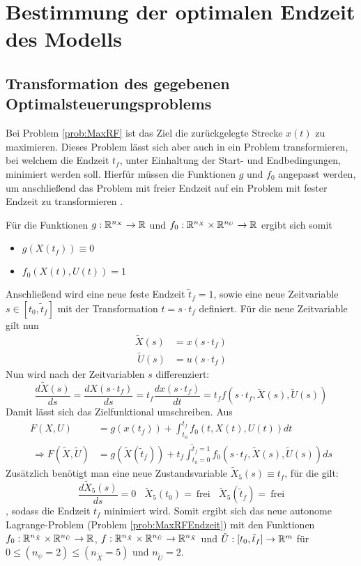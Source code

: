 \chapter{Bestimmung der optimalen Endzeit des Modells}\label{kap:OptTf}

\section{Transformation des gegebenen Optimalsteuerungsproblems}
Bei Problem \ref{prob:MaxRF} ist das Ziel die zurückgelegte Strecke $x(t)$ zu maximieren. Dieses Problem lässt sich aber auch in ein Problem transformieren, bei welchem die Endzeit $t_f$, unter Einhaltung der Start- und Endbedingungen, minimiert werden soll. Hierfür müssen die Funktionen $g$ und $f_0$ angepasst werden, um anschließend das Problem mit freier Endzeit auf ein Problem mit fester Endzeit zu transformieren \cite{Gerdts2011}.

Für die Funktionen $g : \mathbb{R}^{n_X} \to \mathbb{R}$ und $f_0 : \mathbb{R}^{n_X} \times \mathbb{R}^{n_U} \to \mathbb{R}$ ergibt sich somit
\begin{itemize}
\item $g(X(t_f)) \equiv 0$
%
\item $f_0(X(t),U(t)) = 1$ 
\end{itemize}
Anschließend wird eine neue feste Endzeit $\tilde{t}_f = 1$, sowie eine neue Zeitvariable $s \in [t_0,\tilde{t}_f]$ mit der Transformation $t = s \cdot t_f$ definiert. Für die neue Zeitvariable gilt nun
\[\begin{split}
\tilde{X}(s) &= x(s \cdot t_f) \\\
\tilde{U}(s) &= u(s \cdot t_f)
\end{split}\] 
Nun wird nach der Zeitvariablen $s$ differenziert:
\[\dfrac{d \tilde{X}(s)}{ds} = \dfrac{d X(s \cdot t_f)}{ds} = t_f \dfrac{d x(s \cdot t_f)}{dt} = t_f f(s \cdot t_f,\tilde{X}(s),\tilde{U}(s)) \]
Damit lässt sich das Zielfunktional umschreiben. Aus
\[\begin{split}
F(X,U) &= g(x(t_f)) + \int^{t_f}_{t_0} f_0(t,X(t),U(t)) dt \\\
\Rightarrow F(\tilde{X},\tilde{U}) &= g(\tilde{X}(\tilde{t}_f)) + t_f \int^{\tilde{t}_f = 1}_{t_0 = 0} f_0(s \cdot t_f,\tilde{X}(s),\tilde{U}(s)) ds 
\end{split}\]
Zusätzlich benötigt man eine neue Zustandsvariable $\tilde{X}_5(s) \equiv t_f$, für die gilt: \[\dfrac{d \tilde{X}_5(s)}{ds} = 0 \ \ \ \ \tilde{X}_5(t_0) =\ \text{frei} \ \ \ \ \tilde{X}_5(\tilde{t}_f) =\ \text{frei}\], sodass die Endzeit $t_f$ minimiert wird. Somit ergibt sich das neue autonome Lagrange-Problem (Problem \ref{prob:MaxRFEndzeit}) mit den Funktionen $f_0 : \mathbb{R}^{n_{\tilde{X}}} \times \mathbb{R}^{n_{\tilde{U}}} \to \mathbb{R}$, $f : \mathbb{R}^{n_{\tilde{X}}} \times \mathbb{R}^{n_{\tilde{U}}} \to \mathbb{R}^{n_{\tilde{X}}}$ und $\tilde{U} : [t_0,\tilde{t}_f] \to \mathbb{R}^m$ für $0 \leq (n_{\psi} = 2) \leq (n_{\tilde{X}} = 5)$ und $n_{\tilde{U}} = 2$.

